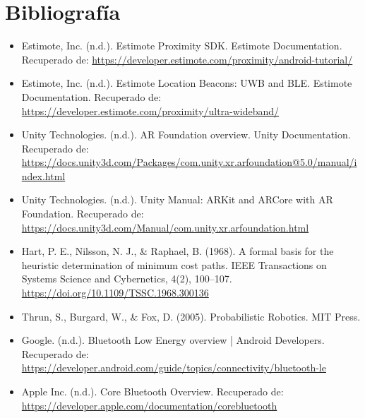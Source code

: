 \documentclass{article}
\begin{document}
\section{Bibliografía}
\begin{itemize} 
    \item  Estimote, Inc. (n.d.). Estimote Proximity SDK. Estimote Documentation. Recuperado de: \url{https://developer.estimote.com/proximity/android-tutorial/}
    
    \item Estimote, Inc. (n.d.). Estimote Location Beacons: UWB and BLE. Estimote Documentation. Recuperado de: \url{https://developer.estimote.com/proximity/ultra-wideband/}
	
	\item Unity Technologies. (n.d.). AR Foundation overview. Unity Documentation. Recuperado de: \url{https://docs.unity3d.com/Packages/com.unity.xr.arfoundation@5.0/manual/index.html}
	
	\item Unity Technologies. (n.d.). Unity Manual: ARKit and ARCore with AR Foundation. Recuperado de: \url{https://docs.unity3d.com/Manual/com.unity.xr.arfoundation.html}
	
	\item Hart, P. E., Nilsson, N. J., \& Raphael, B. (1968). A formal basis for the heuristic determination of minimum cost paths. IEEE Transactions on Systems Science and Cybernetics, 4(2), 100–107. \url{https://doi.org/10.1109/TSSC.1968.300136}
	
	\item Thrun, S., Burgard, W., \& Fox, D. (2005). Probabilistic Robotics. MIT Press.
	
	\item Google. (n.d.). Bluetooth Low Energy overview | Android Developers. Recuperado de: \url{https://developer.android.com/guide/topics/connectivity/bluetooth-le}
	
	\item Apple Inc. (n.d.). Core Bluetooth Overview. Recuperado de: \url{https://developer.apple.com/documentation/corebluetooth}
\end{itemize}
\end{document}
